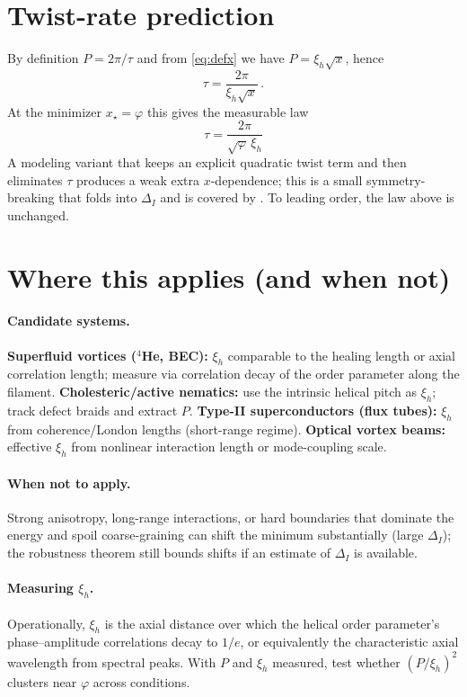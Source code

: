 \documentclass[11pt]{article}
\theoremstyle{remark}
\theoremstyle{definition}
\newcommand{\ph}{\varphi}
\begin{document}
\section{Twist-rate prediction}
By definition $P=2\pi/\tau$ and from \eqref{eq:defx} we have $P=\xi_h\sqrt{x}$, hence
\begin{equation}
 \tau=\frac{2\pi}{\xi_h\sqrt{x}}\,.
\end{equation}
At the minimizer $x_\star=\ph$ this gives the measurable law
\begin{equation}
 \boxed{\;\tau=\dfrac{2\pi}{\sqrt{\ph}\,\xi_h}\;}
\end{equation}
A modeling variant that keeps an explicit quadratic twist term and then eliminates $\tau$ produces a weak extra $x$-dependence; this is a small symmetry-breaking that folds into $\Delta_I$ and is covered by . To leading order, the law above is unchanged.

\section{Where this applies (and when not)}
\paragraph{Candidate systems.} \textbf{Superfluid vortices (\(^{4}\)He, BEC):} $\xi_h$ comparable to the healing length or axial correlation length; measure via correlation decay of the order parameter along the filament. \textbf{Cholesteric/active nematics:} use the intrinsic helical pitch as $\xi_h$; track defect braids and extract $P$. \textbf{Type-II superconductors (flux tubes):} $\xi_h$ from coherence/London lengths (short-range regime). \textbf{Optical vortex beams:} effective $\xi_h$ from nonlinear interaction length or mode-coupling scale.
\paragraph{When not to apply.} Strong anisotropy, long-range interactions, or hard boundaries that dominate the energy and spoil coarse-graining can shift the minimum substantially (large $\Delta_I$); the robustness theorem still bounds shifts if an estimate of $\Delta_I$ is available.
\paragraph{Measuring $\xi_h$.} Operationally, $\xi_h$ is the axial distance over which the helical order parameter's phase--amplitude correlations decay to $1/e$, or equivalently the characteristic axial wavelength from spectral peaks. With $P$ and $\xi_h$ measured, test whether $(P/\xi_h)^2$ clusters near $\ph$ across conditions.
\end{document}

